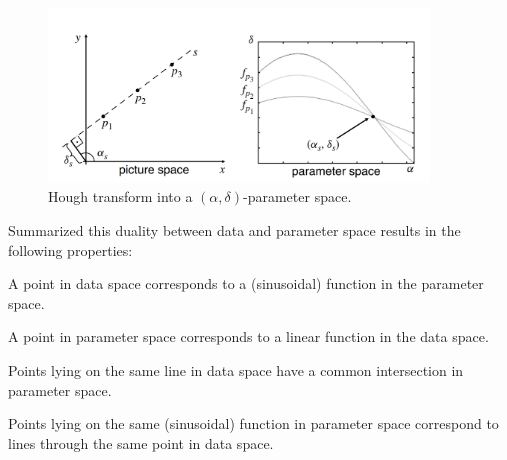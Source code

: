 \begin{figure}
    \centering
    \includegraphics[width=0.9\textwidth]{figures/TODOHOUGHTHETADIST.png}
    \caption{Hough transform into a $(\alpha,\delta)$-parameter space\cite{CASHachtert2008global}.}
    \label{fig:TODOHOUGH}
\end{figure}

Summarized this duality between data and parameter space results in the following properties:\label{ssec:properties}
\begin{property}\label{prop:hough1}
A point in data space corresponds to a (sinusoidal) function in the parameter space. 
\end{property}
\begin{property}\label{prop:hough2}
A point in parameter space corresponds to a linear function in the data space.
\end{property}
\begin{property}\label{prop:hough3}
Points lying on the same line in data space have a common intersection in parameter space.
\end{property}
\begin{property}\label{prop:hough4}
Points lying on the same (sinusoidal) function in parameter space correspond to lines through the same point in data space.
\end{property}

